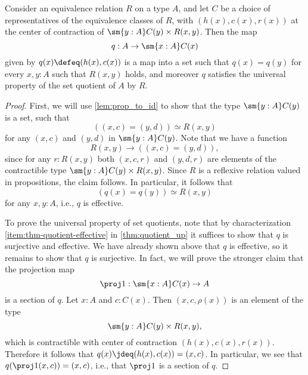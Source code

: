 \begin{thm}\label{thm:choice-of-representatives}
  Consider an equivalence relation $R$ on a type $A$, and let $C$ be a choice of representatives of the equivalence classes of $R$, with $(h(x),c(x),r(x))$ at the center of contraction of $\sm{y:A}C(y)\times R(x,y)$. Then the map
  \begin{equation*}
    q:A\to\sm{x:A}C(x)
  \end{equation*}
  given by $q(x)\defeq(h(x),c(x))$ is a map into a set such that $q(x)=q(y)$ for every $x,y:A$ such that $R(x,y)$ holds, and moreover $q$ satisfies the universal property of the set quotient of $A$ by $R$. 
\end{thm}

\begin{proof}
  First, we will use \cref{lem:prop_to_id} to show that the type $\sm{y:A}C(y)$ is a set, such that
  \begin{equation*}
    ((x,c)=(y,d))\simeq R(x,y)
  \end{equation*}
  for any $(x,c)$ and $(y,d)$ in $\sm{y:A}C(y)$. Note that we have a function
  \begin{equation*}
    R(x,y)\to ((x,c)=(y,d)),
  \end{equation*}
  since for any $r:R(x,y)$ both $(x,c,r)$ and $(y,d,r)$ are elements of the contractible type ${\sm{y:A}C(y)\times R(x,y)}$. Since $R$ is a reflexive relation valued in propositions, the claim follows. In particular, it follows that
  \begin{equation*}
    (q(x)=q(y))\simeq R(x,y)
  \end{equation*}
  for any $x,y:A$, i.e., $q$ is effective.
  
  To prove the universal property of set quotients, note that by characterization \ref{item:thm-quotient-effective} in \cref{thm:quotient_up} it suffices to show that $q$ is surjective and effective. We have already shown above that $q$ is effective, so it remains to show that $q$ is surjective. In fact, we will prove the stronger claim that the projection map
  \begin{equation*}
    \proj 1:\sm{x:A}C(x)\to A  
  \end{equation*}
  is a section of $q$. Let $x:A$ and $c:C(x)$. Then $(x,c,\rho(x))$ is an element of the type
  \begin{equation*}
    \sm{y:A}C(y)\times R(x,y),
  \end{equation*}
  which is contractible with center of contraction $(h(x),c(x),r(x))$. Therefore it follows that $q(x)\jdeq (h(x),c(x))=(x,c)$. In particular, we see that $q(\proj 1(x,c))=(x,c)$, i.e., that $\proj 1$ is a section of $q$.
\end{proof}


